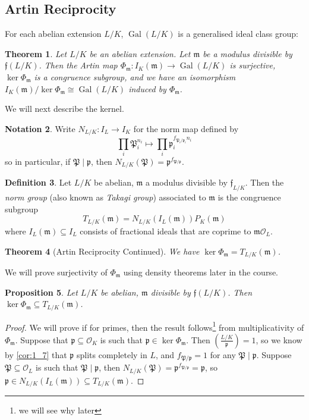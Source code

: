 \documentclass[11pt]{article}
\theoremstyle{definition}
\newtheorem{definition}{Definition}[section]
\newtheorem{notation}[definition]{Notation}
\theoremstyle{plain}
\newtheorem{theorem}[definition]{Theorem}
\newtheorem{proposition}[definition]{Proposition}
\theoremstyle{remark}
\DeclareMathOperator{\Gal}{Gal}
\newcommand{\cO}{\mathcal{O}}
\newcommand{\cp}{\mathfrak{P}}
\newcommand{\ff}{\mathfrak{f}}
\newcommand{\fp}{\mathfrak{p}}
\newcommand{\fm}{\mathfrak{m}}
\newcommand{\leg}[2]{\left(\frac{#1}{#2}\right)}
\begin{document}
\subsection{Artin Reciprocity}

For each abelian extension $L/K$, $\Gal(L/K)$ is a generalised ideal class group:

\begin{theorem}\label{thm:3_6}
    Let $L/K$ be an abelian extension. Let $\fm$ be a modulus divisible by $\ff(L/K)$. Then the Artin map $\Phi_\fm : I_K(\fm) \to \Gal(L/K)$ is surjective, $\ker{\Phi_\fm}$ is a congruence subgroup, and we have an isomorphism $I_K(\fm)/\ker \Phi_\fm \cong \Gal(L/K)$ induced by $\Phi_\fm$.
\end{theorem}

We will next describe the kernel.

\begin{notation}\label{not:3_7}
    Write $N_{L/K} : I_L \to I_K$ for the norm map defined by
    \begin{equation*}
        \prod_i \cp_i^{n_i} \mapsto \prod_i \fp_i^{f_{\cp_i / \fp_i} n_i}
    \end{equation*}
    so in particular, if $\cp \mid \fp$, then $N_{L/K}(\cp) = \fp^{f_{\cp/\fp}}$.
\end{notation}

\begin{definition}\label{def:3_8}
    Let $L/K$ be abelian, $\fm$ a modulus divisible by $\ff_{L/K}$. Then the \emph{norm group} (also known as \emph{Takagi group}) associated to $\fm$ is the congruence subgroup
    \begin{equation*}
        T_{L/K}(\fm) = N_{L/K}(I_L(\fm))P_K(\fm)
    \end{equation*}
    where $I_L(\fm) \subseteq I_L$ consists of fractional ideals that are coprime to $\fm \cO_L$.
\end{definition}

\begin{theorem}[Artin Reciprocity Continued]\label{thm:3_9}
    We have $\ker \Phi_\fm = T_{L/K}(\fm)$.
\end{theorem}

We will prove surjectivity of $\Phi_\fm$ using density theorems later in the course.

\begin{proposition}\label{prop:3_10}
    Let $L/K$ be abelian, $\fm$ divisible by $\ff(L/K)$. Then $\ker \Phi_\fm \subseteq T_{L/K}(\fm)$.
\end{proposition}
\begin{proof}
    We will prove if for primes, then the result follows\footnote{we will see why later} from multiplicativity of $\Phi_\fm$. Suppose that $\fp \subseteq \cO_K$ is such that $\fp \in \ker \Phi_\fm$. Then $\leg{L/K}{\fp} = 1$, so we know by \autoref{cor:1_7} that $\fp$ splits completely in $L$, and $f_{\cp / \fp} = 1$ for any $\cp \mid \fp$. Suppose $\cp \subseteq \cO_L$ is such that $\cp \mid \fp$, then $N_{L/K}(\cp) = \fp^{f_{\cp/\fp}} = \fp$, so $\fp \in N_{L/K}(I_L(\fm)) \subseteq T_{L/K}(\fm)$.
\end{proof}
\end{document}

